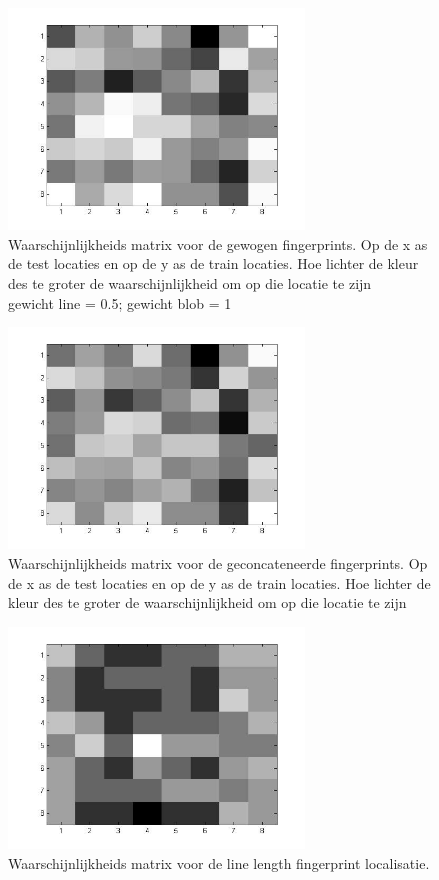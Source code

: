 \documentclass[a4paper]{article}
\begin{document}
\begin{figure}[h]
	\centering
	\includegraphics[width=0.7\textwidth]{combinedconfusion.jpg}
	\caption{Waarschijnlijkheids matrix voor de gewogen fingerprints. Op de x as de test locaties en op de y as de train locaties. Hoe lichter de kleur des te groter de waarschijnlijkheid om op die locatie te zijn\\gewicht line = 0.5; gewicht blob = 1}
	\label{fig:combinedconfusion}
\end{figure}
\begin{figure}[h]
	\centering
	\includegraphics[width=0.7\textwidth]{combinedconfusion_concat.jpg}
	\caption{Waarschijnlijkheids matrix voor de geconcateneerde fingerprints.  Op de x as de test locaties en op de y as de train locaties. Hoe lichter de kleur des te groter de waarschijnlijkheid om op die locatie te zijn}
	\label{fig:combinedconfusion_concat}
\end{figure}
\begin{figure}[h]
	\centering
	\includegraphics[width=0.7\textwidth]{linelength.jpg}
	\caption{Waarschijnlijkheids matrix voor de line length fingerprint localisatie.}
	\label{fig:linelength}
\end{figure}
\end{document}
